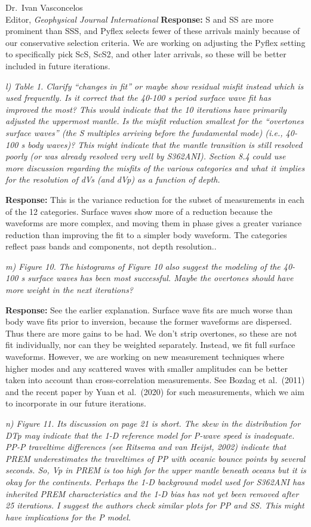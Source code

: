 \documentclass[11pt,a4paper]{letter}
\newcommand{\response}[1]{\textbf{Response:} #1}
\newcommand{\rev}[1]{{\it{#1}}}
\begin{document}
\begin{letter}{Dr.~Ivan Vasconcelos\\
Editor, \textit{Geophysical Journal International}}
\response{S and SS are more prominent than SSS, and Pyflex selects fewer of these arrivals mainly because of our conservative selection criteria. We are working on adjusting the Pyflex setting to specifically pick ScS, ScS2, and other later arrivals, so these will be better included in future iterations.}

\rev{l) Table 1. Clarify ``changes in fit'' or maybe show residual misfit instead which is used frequently. Is it correct that the 40-100 s period surface wave fit has improved the most? This would indicate that the 10 iterations have primarily adjusted the uppermost mantle.
Is the misfit reduction smallest for the ``overtones surface waves'' (the S multiples arriving before the fundamental mode) (i.e., 40-100 s body waves)?
This might indicate that the mantle transition is still resolved poorly (or was already resolved very well by S362ANI).
Section 8.4 could use more discussion regarding the misfits of the various categories and what it implies for the resolution of dVs (and dVp) as a function of depth.
}

\response{This is the variance reduction for the subset of measurements in each of the 12 categories. Surface waves show more of a reduction because the waveforms are more complex, and moving them in phase gives a greater variance reduction than improving the fit to a simpler body waveform. The categories reflect pass bands and components, not depth resolution..}

\rev{m) Figure 10. The histograms of Figure 10 also suggest the modeling of the 40-100 s surface waves has been most successful. Maybe the overtones should have more weight in the next iterations?
}

\response{See the earlier explanation.
Surface wave fits are much worse than body wave fits prior to inversion, because the former waveforms are dispersed.
Thus there are more gains to be had. We don't strip overtones, so these are not fit individually, nor can they be weighted separately.
Instead, we fit full surface waveforms. However, we are working on new measurement techniques where higher modes and any scattered waves with smaller amplitudes can be better taken into account than cross-correlation measurements. See Bozdag et al.~(2011) and the recent paper by Yuan et al.~(2020) for such measurements, which we aim to incorporate in our future iterations. 
}

\rev{n) Figure 11. Its discussion on page 21 is short. The skew in the distribution for DTp may indicate that the 1-D reference model for P-wave speed is inadequate. PP-P traveltime differences (see Ritsema and van Heijst, 2002) indicate that PREM underestimates the traveltimes of PP with oceanic bounce points by several seconds.
So, Vp in PREM is too high for the upper mantle beneath oceans but it is okay for the continents. Perhaps the 1-D background model used for S362ANI has inherited PREM characteristics and the 1-D bias has not yet been removed after 25 iterations.
I suggest the authors check similar plots for PP and SS. This might have implications for the P model.
}


\end{letter}
\end{document}

